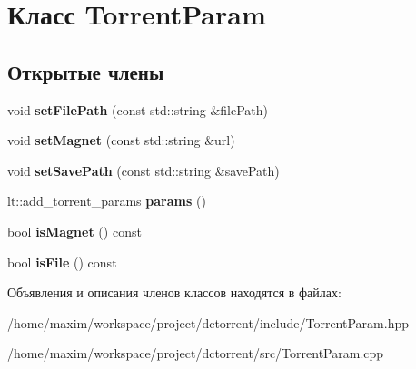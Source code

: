 \hypertarget{class_torrent_param}{}\section{Класс Torrent\+Param}
\label{class_torrent_param}
\subsection*{Открытые члены}
\begin{DoxyCompactItemize}
\item 
\mbox{\label{class_torrent_param_acdc640b26946ecec8aaee930c110c0c1}} 
void {\bfseries set\+File\+Path} (const std\+::string \&file\+Path)
\item 
\mbox{\label{class_torrent_param_a6f4c51423ed8424f6e3ecf20f487e5e8}} 
void {\bfseries set\+Magnet} (const std\+::string \&url)
\item 
\mbox{\label{class_torrent_param_a99d7b501c72b4ce55165bb52f05ea96f}} 
void {\bfseries set\+Save\+Path} (const std\+::string \&save\+Path)
\item 
\mbox{\label{class_torrent_param_ad0b9c2afa31bf6656320729f411080c7}} 
lt\+::add\+\_\+torrent\+\_\+params {\bfseries params} ()
\item 
\mbox{\label{class_torrent_param_a197b1db24cc471524e4d7d6f16659d35}} 
bool {\bfseries is\+Magnet} () const
\item 
\mbox{\label{class_torrent_param_a3cbd43a4cc67bd93be05f16abb555a63}} 
bool {\bfseries is\+File} () const
\end{DoxyCompactItemize}


Объявления и описания членов классов находятся в файлах\+:\begin{DoxyCompactItemize}
\item 
/home/maxim/workspace/project/dctorrent/include/Torrent\+Param.\+hpp\item 
/home/maxim/workspace/project/dctorrent/src/Torrent\+Param.\+cpp\end{DoxyCompactItemize}
